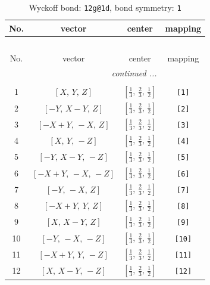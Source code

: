 \documentclass[fleqn,8pt]{jsarticle}
\begin{document}
\begin{longtable}{cccc}
\caption{Wyckoff bond: {\tt 12g@1d}, bond symmetry: {\tt 1}}
 \\
 \hline \hline
No. & vector & center & mapping \\ \hline \endfirsthead

\multicolumn{3}{l}{\tablename\ \thetable{}} \\
 \hline \hline
No. & vector & center & mapping \\ \hline \endhead

 \hline \hline
\multicolumn{3}{r}{\footnotesize\it continued ...} \\ \endfoot

 \hline \hline
\multicolumn{3}{r}{} \\ \endlastfoot

1 & $\left[ X,\, Y,\, Z \right]$ & $\left[ \frac{1}{3},\, \frac{2}{3},\, \frac{1}{2} \right]$ & {\tt [1]} \\ \hline
2 & $\left[ - Y,\, X - Y,\, Z \right]$ & $\left[ \frac{1}{3},\, \frac{2}{3},\, \frac{1}{2} \right]$ & {\tt [2]} \\ \hline
3 & $\left[ - X + Y,\, - X,\, Z \right]$ & $\left[ \frac{1}{3},\, \frac{2}{3},\, \frac{1}{2} \right]$ & {\tt [3]} \\ \hline
4 & $\left[ X,\, Y,\, - Z \right]$ & $\left[ \frac{1}{3},\, \frac{2}{3},\, \frac{1}{2} \right]$ & {\tt [4]} \\ \hline
5 & $\left[ - Y,\, X - Y,\, - Z \right]$ & $\left[ \frac{1}{3},\, \frac{2}{3},\, \frac{1}{2} \right]$ & {\tt [5]} \\ \hline
6 & $\left[ - X + Y,\, - X,\, - Z \right]$ & $\left[ \frac{1}{3},\, \frac{2}{3},\, \frac{1}{2} \right]$ & {\tt [6]} \\ \hline
7 & $\left[ - Y,\, - X,\, Z \right]$ & $\left[ \frac{1}{3},\, \frac{2}{3},\, \frac{1}{2} \right]$ & {\tt [7]} \\ \hline
8 & $\left[ - X + Y,\, Y,\, Z \right]$ & $\left[ \frac{1}{3},\, \frac{2}{3},\, \frac{1}{2} \right]$ & {\tt [8]} \\ \hline
9 & $\left[ X,\, X - Y,\, Z \right]$ & $\left[ \frac{1}{3},\, \frac{2}{3},\, \frac{1}{2} \right]$ & {\tt [9]} \\ \hline
10 & $\left[ - Y,\, - X,\, - Z \right]$ & $\left[ \frac{1}{3},\, \frac{2}{3},\, \frac{1}{2} \right]$ & {\tt [10]} \\ \hline
11 & $\left[ - X + Y,\, Y,\, - Z \right]$ & $\left[ \frac{1}{3},\, \frac{2}{3},\, \frac{1}{2} \right]$ & {\tt [11]} \\ \hline
12 & $\left[ X,\, X - Y,\, - Z \right]$ & $\left[ \frac{1}{3},\, \frac{2}{3},\, \frac{1}{2} \right]$ & {\tt [12]} \\
\end{longtable}
\end{document}
